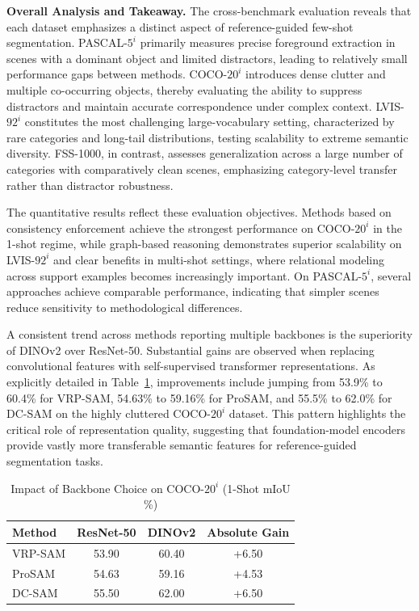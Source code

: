 \documentclass[journal,12pt,onecolumn,draftclsnofoot]{IEEEtran}
\begin{document}
\noindent\textbf{Overall Analysis and Takeaway.}
The cross-benchmark evaluation reveals that each dataset emphasizes a distinct aspect of reference-guided few-shot segmentation. PASCAL-$5^i$ primarily measures precise foreground extraction in scenes with a dominant object and limited distractors, leading to relatively small performance gaps between methods. COCO-$20^i$ introduces dense clutter and multiple co-occurring objects, thereby evaluating the ability to suppress distractors and maintain accurate correspondence under complex context. LVIS-$92^i$ constitutes the most challenging large-vocabulary setting, characterized by rare categories and long-tail distributions, testing scalability to extreme semantic diversity. FSS-1000, in contrast, assesses generalization across a large number of categories with comparatively clean scenes, emphasizing category-level transfer rather than distractor robustness.

The quantitative results reflect these evaluation objectives. Methods based on consistency enforcement achieve the strongest performance on COCO-$20^i$ in the 1-shot regime, while graph-based reasoning demonstrates superior scalability on LVIS-$92^i$ and clear benefits in multi-shot settings, where relational modeling across support examples becomes increasingly important. On PASCAL-$5^i$, several approaches achieve comparable performance, indicating that simpler scenes reduce sensitivity to methodological differences.

A consistent trend across methods reporting multiple backbones is the superiority of DINOv2 over ResNet-50. Substantial gains are observed when replacing convolutional features with self-supervised transformer representations. As explicitly detailed in Table~\ref{tab:backbone_comp}, improvements include jumping from 53.9\% to 60.4\% for VRP-SAM, 54.63\% to 59.16\% for ProSAM, and 55.5\% to 62.0\% for DC-SAM on the highly cluttered COCO-$20^i$ dataset. This pattern highlights the critical role of representation quality, suggesting that foundation-model encoders provide vastly more transferable semantic features for reference-guided segmentation tasks.

\begin{table}[htbp]
\centering
\caption{Impact of Backbone Choice on COCO-$20^i$ (1-Shot mIoU \%)}
\label{tab:backbone_comp}
\begin{tabular}{l c c c}
\toprule
\textbf{Method} & \textbf{ResNet-50} & \textbf{DINOv2} & \textbf{Absolute Gain} \\
\midrule
VRP-SAM \cite{sun2024vrp} & 53.90 & 60.40 & +6.50 \\
ProSAM \cite{wang2025prosam} & 54.63 & 59.16 & +4.53 \\
DC-SAM \cite{qi2025dcsam} & 55.50 & 62.00 & +6.50 \\
\bottomrule
\end{tabular}
\end{table}
\end{document}

